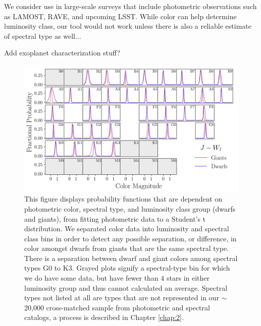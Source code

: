 We consider use in large-scale  surveys that include photometric observations such as LAMOST, RAVE, and upcoming LSST. While color can help determine luminosity class, our tool would not work unless there is also a reliable estimate of spectral type as well...

Add exoplanet characterization stuff?

\begin{figure}
    \centering
    \includegraphics[width=1.0\textwidth,clip=true]{Figures/periodic/periodic-t-pdf_J_W1.png}
    \caption{This figure displays probability functions that are dependent on photometric color, spectral type, and luminosity class group (dwarfs and giants), from fitting photometric data to a Student's t distribution. We separated color data into luminosity and spectral class bins in order to detect any possible separation, or difference, in color amongst dwarfs from giants that are the same spectral type. There is a separation between dwarf and giant colors among spectral types G0 to K3. Grayed plots signify a spectral-type bin for which we do have some data, but have fewer than 4 stars in either luminosity group and thus cannot calculated an average. Spectral types not listed at all are types that are not represented in our $\sim$20,000 cross-matched sample from photometric and spectral catalogs, a process is described in Chapter \ref{chap:2}.}
    \label{fig:periodic-pdf-jw1}
\end{figure}

